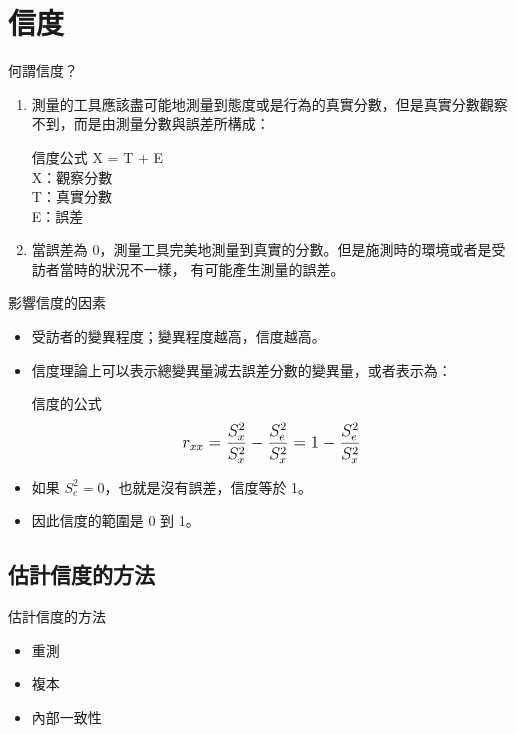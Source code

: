 \documentclass[xcolor=dvipsnames, 13pt]{beamer}
\begin{document}
\section{信度}
\begin{frame}{何謂信度？}
\begin{enumerate}
\item 測量的工具應該盡可能地測量到態度或是行為的真實分數，但是真實分數觀察不到，而是由測量分數與誤差所構成：
\begin{block}{信度公式}
X = T + E \\
X：觀察分數 \\
T：真實分數 \\
E：誤差
\end{block}
\item 當誤差為 0，測量工具完美地測量到真實的分數。但是施測時的環境或者是受訪者當時的狀況不一樣，
有可能產生測量的誤差。
\end{enumerate}
\end{frame}
\begin{frame}{影響信度的因素}
\begin{itemize}
\item 受訪者的變異程度；變異程度越高，信度越高。
\item 信度理論上可以表示總變異量減去誤差分數的變異量，或者表示為：
\begin{block}{信度的公式}
\begin{equation*}
\mathlarger{r_{xx} = \frac{S_{x}^2}{S_{x}^2} - \frac{S_{e}^2}{S_{x}^2} = 1- \frac{S_{e}^2}{S_{x}^2} }
\end{equation*}
\end{block}
\item 如果 $S_{e}^2 = 0$，也就是沒有誤差，信度等於 1。
\item 因此信度的範圍是 0 到 1。
\end{itemize}
\end{frame}
\subsection{估計信度的方法}
\begin{frame}{估計信度的方法}
\begin{itemize}
\item 重測
\item 複本
\item 內部一致性
\end{itemize}
\end{frame}
\end{document}
